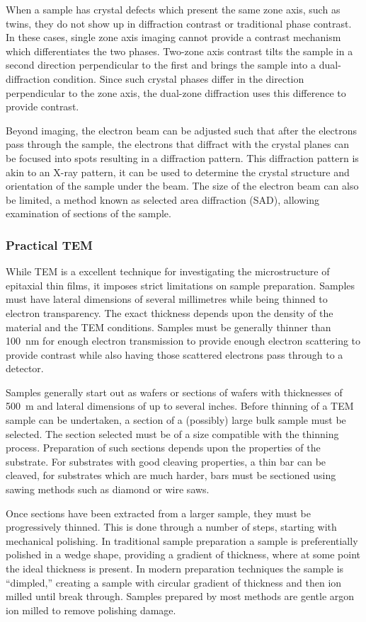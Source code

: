 When a sample has crystal defects which present the same zone axis, such as twins, they do not show up in diffraction contrast or traditional phase contrast.
In these cases, single zone axis imaging cannot provide a contrast mechanism which differentiates the two phases.
Two-zone axis contrast tilts the sample in a second direction perpendicular to the first and brings the sample into a dual-diffraction condition.
Since such crystal phases differ in the direction perpendicular to the zone axis, the dual-zone diffraction uses this difference to provide contrast.

Beyond imaging, the electron beam can be adjusted such that after the electrons pass through the sample, the electrons that diffract with the crystal planes can be focused into spots resulting in a diffraction pattern.
This diffraction pattern is akin to an X-ray pattern, it can be used to determine the crystal structure and orientation of the sample under the beam.
The size of the electron beam can also be limited, a method known as selected area diffraction (SAD), allowing examination of sections of the sample.
\subsubsection{Practical TEM} While TEM is a excellent technique for investigating the microstructure of epitaxial thin films, it imposes strict limitations on sample preparation.
Samples must have lateral dimensions of several millimetres while being thinned to electron transparency.
The exact thickness depends upon the density of the material and the TEM conditions.
Samples must be generally thinner than 100~nm for enough electron transmission to provide enough electron scattering to provide contrast while also having those scattered electrons pass through to a detector.

Samples generally start out as wafers or sections of wafers with thicknesses of 500~\micro{}m and lateral dimensions of up to several inches.
Before thinning of a TEM sample can be undertaken, a section of a (possibly) large bulk sample must be selected.
The section selected must be of a size compatible with the thinning process.
Preparation of such sections depends upon the properties of the substrate.
For substrates with good cleaving properties, a thin bar can be cleaved, for substrates which are much harder, bars must be sectioned using sawing methods such as diamond or wire saws.

Once sections have been extracted from a larger sample, they must be progressively thinned.
This is done through a number of steps, starting with mechanical polishing.
In traditional sample preparation a sample is preferentially polished in a wedge shape, providing a gradient of thickness, where at some point the ideal thickness is present.
In modern preparation techniques the sample is ``dimpled,'' creating a sample with circular gradient of thickness and then ion milled until break through.
Samples prepared by most methods are gentle argon ion milled to remove polishing damage.

